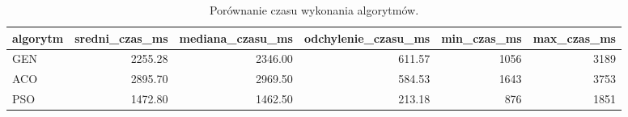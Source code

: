 \begin{table}
\caption{Porównanie czasu wykonania algorytmów.}
\label{tab:czas_wykonania}
\begin{tabular}{lrrrrr}
\toprule
algorytm & sredni_czas_ms & mediana_czasu_ms & odchylenie_czasu_ms & min_czas_ms & max_czas_ms \\
\midrule
GEN & 2255.28 & 2346.00 & 611.57 & 1056 & 3189 \\
ACO & 2895.70 & 2969.50 & 584.53 & 1643 & 3753 \\
PSO & 1472.80 & 1462.50 & 213.18 & 876 & 1851 \\
\bottomrule
\end{tabular}
\end{table}
